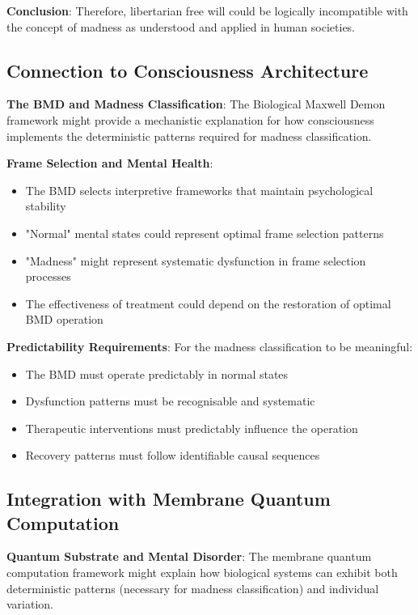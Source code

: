 \documentclass[12pt]{article}
\begin{document}
\textbf{Conclusion}: Therefore, libertarian free will could be logically incompatible with the concept of madness as understood and applied in human societies.

\subsection{Connection to Consciousness Architecture}

\textbf{The BMD and Madness Classification}: The Biological Maxwell Demon framework might provide a mechanistic explanation for how consciousness implements the deterministic patterns required for madness classification.

\textbf{Frame Selection and Mental Health}:
\begin{itemize}
\item The BMD selects interpretive frameworks that maintain psychological stability
\item "Normal" mental states could represent optimal frame selection patterns
\item "Madness" might represent systematic dysfunction in frame selection processes
\item The effectiveness of treatment could depend on the restoration of optimal BMD operation
\end{itemize}

\textbf{Predictability Requirements}: For the madness classification to be meaningful:
\begin{itemize}
\item The BMD must operate predictably in normal states
\item Dysfunction patterns must be recognisable and systematic
\item Therapeutic interventions must predictably influence the operation
\item Recovery patterns must follow identifiable causal sequences
\end{itemize}

\subsection{Integration with Membrane Quantum Computation}

\textbf{Quantum Substrate and Mental Disorder}: The membrane quantum computation framework might explain how biological systems can exhibit both deterministic patterns (necessary for madness classification) and individual variation.
\end{document}
